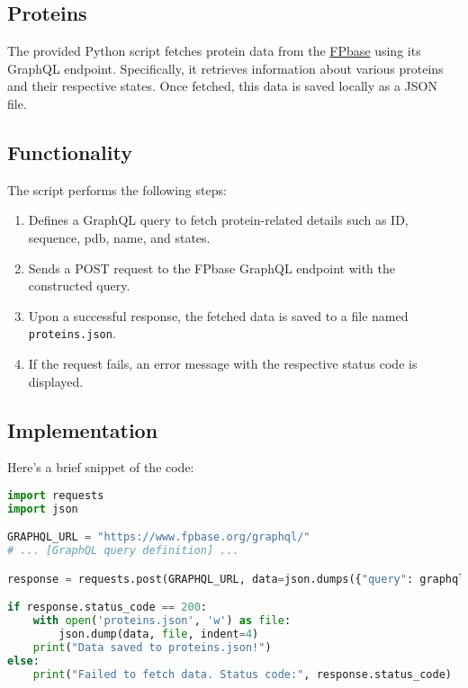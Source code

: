 \documentclass{article}
\begin{document}
\subsection{Proteins}

The provided Python script fetches protein data from the \href{https://www.fpbase.org/}{FPbase} using its GraphQL endpoint. Specifically, it retrieves information about various proteins and their respective states. Once fetched, this data is saved locally as a JSON file.

\subsection{Functionality}

The script performs the following steps:

\begin{enumerate}
    \item Defines a GraphQL query to fetch protein-related details such as ID, sequence, pdb, name, and states.
    \item Sends a POST request to the FPbase GraphQL endpoint with the constructed query.
    \item Upon a successful response, the fetched data is saved to a file named \texttt{proteins.json}.
    \item If the request fails, an error message with the respective status code is displayed.
\end{enumerate}

\subsection{Implementation}

Here's a brief snippet of the code:

\begin{lstlisting}[language=Python]
import requests
import json

GRAPHQL_URL = "https://www.fpbase.org/graphql/"
# ... [GraphQL query definition] ...

response = requests.post(GRAPHQL_URL, data=json.dumps({"query": graphql_query}), headers=headers)

if response.status_code == 200:
    with open('proteins.json', 'w') as file:
        json.dump(data, file, indent=4)
    print("Data saved to proteins.json!")
else:
    print("Failed to fetch data. Status code:", response.status_code)
\end{lstlisting}
\end{document}
